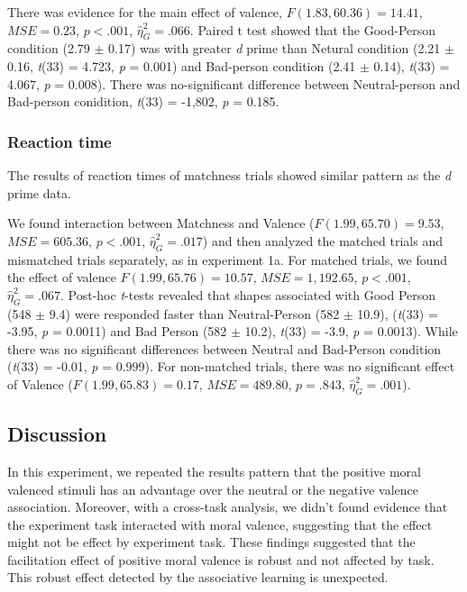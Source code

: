\documentclass[
  english,
  man]{apa6}
\begin{document}
There was evidence for the main effect of valence, \(F(1.83, 60.36) = 14.41\), \(\mathit{MSE} = 0.23\), \(p < .001\), \(\hat{\eta}^2_G = .066\). Paired t test showed that the Good-Person condition (2.79 \(\pm\) 0.17) was with greater \emph{d} prime than Netural condition (2.21 \(\pm\) 0.16, \emph{t}(33) = 4.723, \emph{p} = 0.001) and Bad-person condition (2.41 \(\pm\) 0.14), \emph{t}(33) = 4.067, \emph{p} = 0.008). There was no-significant difference between Neutral-person and Bad-person conidition, \emph{t}(33) = -1,802, \emph{p} = 0.185.

\hypertarget{reaction-time-2}{%
\subsubsection{Reaction time}\label{reaction-time-2}}

The results of reaction times of matchness trials showed similar pattern as the \emph{d} prime data.

We found interaction between Matchness and Valence (\(F(1.99, 65.70) = 9.53\), \(\mathit{MSE} = 605.36\), \(p < .001\), \(\hat{\eta}^2_G = .017\)) and then analyzed the matched trials and mismatched trials separately, as in experiment 1a. For matched trials, we found the effect of valence \(F(1.99, 65.76) = 10.57\), \(\mathit{MSE} = 1,192.65\), \(p < .001\), \(\hat{\eta}^2_G = .067\). Post-hoc \emph{t}-tests revealed that shapes associated with Good Person (548 \(\pm\) 9.4) were responded faster than Neutral-Person (582 \(\pm\) 10.9), (\emph{t}(33) = -3.95, \emph{p} = 0.0011) and Bad Person (582 \(\pm\) 10.2), \emph{t}(33) = -3.9, \emph{p} = 0.0013). While there was no significant differences between Neutral and Bad-Person condition (\emph{t}(33) = -0.01, \emph{p} = 0.999). For non-matched trials, there was no significant effect of Valence (\(F(1.99, 65.83) = 0.17\), \(\mathit{MSE} = 489.80\), \(p = .843\), \(\hat{\eta}^2_G = .001\)).

\hypertarget{discussion-2}{%
\subsection{Discussion}\label{discussion-2}}

In this experiment, we repeated the results pattern that the positive moral valenced stimuli has an advantage over the neutral or the negative valence association. Moreover, with a cross-task analysis, we didn't found evidence that the experiment task interacted with moral valence, suggesting that the effect might not be effect by experiment task.
These findings suggested that the facilitation effect of positive moral valence is robust and not affected by task. This robust effect detected by the associative learning is unexpected.
\end{document}
